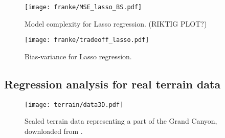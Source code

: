         \begin{figure}
            \texttt{[image: franke/MSE\_lasso\_BS.pdf]}
            \caption{Model complexity for Lasso regression. (RIKTIG PLOT?)}
            \label{fig:model_complexity_lasso}
        \end{figure}

        \begin{figure}
            \texttt{[image: franke/tradeoff\_lasso.pdf]}
            \caption{Bias-variance for Lasso regression.}
            \label{fig:bias_variance_lasso}
        \end{figure}



    \subsection{Regression analysis for real terrain data}\label{sec:reganalysis_real_data}

    \begin{figure}
        \texttt{[image: terrain/data3D.pdf]}
        \caption{Scaled terrain data representing a part of the Grand Canyon, downloaded from \citep{EarthExplorer}.}
        \label{fig:gc_data}
    \end{figure}